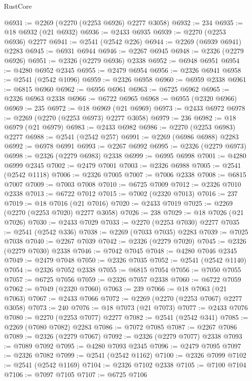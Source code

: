 \begin{lexlean}{RustCore}
\begin{coremodule}
@6931 := @2269 (@2270 (@2253 @6926) @2277 @3058)
@6932 := 234
@6935 := @18 @6932 (@21 @6932)
@6936 := @2433 @6935
@6939 := @2270 (@2253 @6936) @2277
@6941 := @2541 (@2542 @226)
@6944 := @2269 (@6939 @6941) @2283
@6945 := @6931 @6944
@6946 := @2267 @6945
@6948 := @2326 (@2279 @6926)
@6951 := @2326 (@2279 @6936) @2338
@6952 := @6948 @6951
@6954 := @4280 @6952 @2345
@6955 := @2479 @6954
@6956 := @2326 @6941
@6958 := @2541 (@2542 @1096)
@6959 := @2326 @6958
@6960 := @6959 @2338
@6961 := @6815 @6960
@6962 := @6956 @6961
@6963 := @6725 @6962
@6965 := @2326 @6963 @2338
@6966 := @6722 @6965
@6968 := @6955 (@2320 @6966)
@6969 := 235
@6972 := @18 @6969 (@21 @6969)
@6973 := @2433 @6972
@6978 := @2269 (@2270 (@2253 @6973) @2277 @3058)
@6979 := 236
@6982 := @18 @6979 (@21 @6979)
@6983 := @2433 @6982
@6986 := @2270 (@2253 @6983) @2277
@6988 := @2541 (@2542 @257)
@6991 := @2269 (@6986 @6988) @2283
@6992 := @6978 @6991
@6993 := @2267 @6992
@6995 := @2326 (@2279 @6973)
@6998 := @2326 (@2279 @6983) @2338
@6999 := @6995 @6998
@7001 := @4280 @6999 @2345
@7002 := @2479 @7001
@7003 := @2326 @6988
@7005 := @2541 (@2542 @1118)
@7006 := @2326 @7005
@7007 := @7006 @2338
@7008 := @6815 @7007
@7009 := @7003 @7008
@7010 := @6725 @7009
@7012 := @2326 @7010 @2338
@7013 := @6722 @7012
@7015 := @7002 (@2320 @7013)
@7016 := 237
@7019 := @18 @7016 (@21 @7016)
@7020 := @2433 @7019
@7025 := @2269 (@2270 (@2253 @7020) @2277 @3058)
@7026 := 238
@7029 := @18 @7026 (@21 @7026)
@7030 := @2433 @7029
@7033 := @2270 (@2253 @7030) @2277
@7035 := @2541 (@2542 @336)
@7038 := @2269 (@7033 @7035) @2283
@7039 := @7025 @7038
@7040 := @2267 @7039
@7042 := @2326 (@2279 @7020)
@7045 := @2326 (@2279 @7030) @2338
@7046 := @7042 @7045
@7048 := @4280 @7046 @2345
@7049 := @2479 @7048
@7050 := @2326 @7035
@7052 := @2541 (@2542 @1140)
@7054 := @2326 @7052 @2338
@7055 := @6815 @7054
@7056 := @7050 @7055
@7057 := @6725 @7056
@7059 := @2326 @7057 @2338
@7060 := @6722 @7059
@7062 := @7049 (@2320 @7060)
@7063 := 239
@7066 := @18 @7063 (@21 @7063)
@7067 := @2433 @7066
@7072 := @2269 (@2270 (@2253 @7067) @2277 @3058)
@7073 := 240
@7076 := @18 @7073 (@21 @7073)
@7077 := @2433 @7076
@7080 := @2270 (@2253 @7077) @2277
@7082 := @2541 (@2542 @341)
@7085 := @2269 (@7080 @7082) @2283
@7086 := @7072 @7085
@7087 := @2267 @7086
@7089 := @2326 (@2279 @7067)
@7092 := @2326 (@2279 @7077) @2338
@7093 := @7089 @7092
@7095 := @4280 @7093 @2345
@7096 := @2479 @7095
@7097 := @2326 @7082
@7099 := @2541 (@2542 @1162)
@7100 := @2326 @7099
@7102 := @2541 (@2542 @1169)
@7104 := @2326 @7102 @2338
@7105 := @7100 @7104
@7106 := @7097 @7105
@7107 := @6725 @7106

\end{coremodule}
\end{lexlean}
